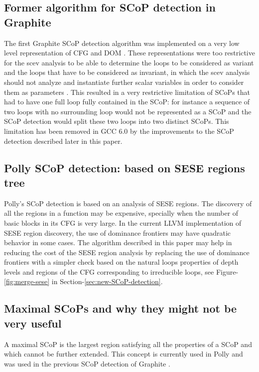 \documentclass{sig-alternate}
\begin{document}
\subsection{Former algorithm for SCoP detection in Graphite}
\label{subsec:graphite-SCoP}
The first Graphite SCoP detection algorithm was implemented on a very low level
representation of CFG and DOM \cite{graphite}.  These representations were too
restrictive for the scev analysis to be able to determine the loops to be
considered as variant and the loops that have to be considered as invariant, in
which the scev analysis should not analyze and instantiate further scalar
variables in order to consider them as parameters \cite{scev}.  This resulted in
a very restrictive limitation of SCoPs that had to have one full loop fully
contained in the SCoP: for instance a sequence of two loops with no surrounding
loop would not be represented as a SCoP and the SCoP detection would split these
two loops into two distinct SCoPs.  This limitation has been removed in GCC 6.0
by the improvements to the SCoP detection described later in this paper.

\subsection{Polly SCoP detection: based on SESE regions tree}
\label{subsec:polly-SCoP}
Polly's SCoP detection is based on an analysis of SESE regions.  The discovery
of all the regions in a function may be expensive, specially when the number of
basic blocks in its CFG is very large.  In the current LLVM implementation of
SESE region discovery, the use of dominance frontiers may have quadratic
behavior in some cases.  The algorithm described in this paper may help in
reducing the cost of the SESE region analysis by replacing the use of dominance
frontiers with a simpler check based on the natural loops properties of depth
levels and regions of the CFG corresponding to irreducible loops, see
Figure-\ref{fig:merge-sese} in Section-\ref{sec:new-SCoP-detection}.

\subsection{Maximal SCoPs and why they might not be very useful}
\label{subsec:maximality}
A maximal SCoP is the largest region satisfying all the properties of a SCoP and
which cannot be further extended.  This concept is currently used in Polly
\cite{polly} and was used in the previous SCoP detection of Graphite
\cite{graphite}.
\end{document}

